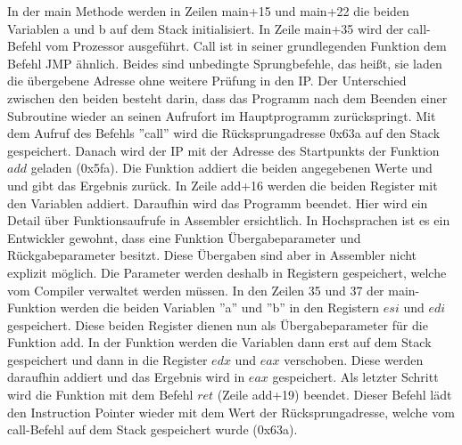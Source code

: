 \documentclass[a4paper,12pt]{article}
\begin{document}
\newpage\par\smallskip\noindent In der main Methode werden in Zeilen main+15 und main+22 die beiden Variablen a und b auf dem Stack initialisiert. In Zeile main+35 wird der call-Befehl vom Prozessor ausgeführt. Call ist in seiner grundlegenden Funktion dem Befehl JMP ähnlich. Beides sind unbedingte Sprungbefehle, das heißt, sie laden die übergebene Adresse ohne weitere Prüfung in den IP. Der Unterschied zwischen den beiden besteht darin, dass das Programm nach dem Beenden einer Subroutine wieder an seinen Aufrufort im Hauptprogramm zurückspringt. Mit dem Aufruf des Befehls ''call'' wird die Rücksprungadresse 0x63a auf den Stack gespeichert. Danach wird der IP mit der Adresse des Startpunkts der Funktion $add$ geladen (0x5fa). Die Funktion addiert die beiden angegebenen Werte und und gibt das Ergebnis zurück. In Zeile add+16 werden die beiden Register mit den Variablen addiert. Daraufhin wird das Programm beendet. Hier wird ein Detail über Funktionsaufrufe in Assembler ersichtlich. In Hochsprachen ist es ein Entwickler gewohnt, dass eine Funktion Übergabeparameter und Rückgabeparameter besitzt. Diese Übergaben sind aber in Assembler nicht explizit möglich. Die Parameter werden deshalb in Registern gespeichert, welche vom Compiler verwaltet werden müssen. In den Zeilen 35 und 37 der main-Funktion werden die beiden Variablen ''a'' und ''b'' in den Registern $esi$ und $edi$ gespeichert. Diese beiden Register dienen nun als Übergabeparameter für die Funktion add. In der Funktion werden die Variablen dann erst auf dem Stack gespeichert und dann in die Register $edx$ und $eax$ verschoben. Diese werden daraufhin addiert und das Ergebnis wird in $eax$ gespeichert. Als letzter Schritt wird die Funktion mit dem Befehl $ret$ (Zeile add+19) beendet. Dieser Befehl lädt den Instruction Pointer wieder mit dem Wert der Rücksprungadresse, welche vom call-Befehl auf dem Stack gespeichert wurde (0x63a).
\end{document}
